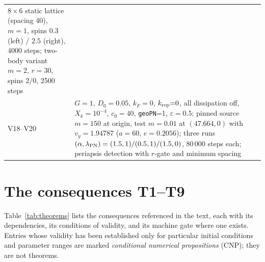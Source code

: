 \documentclass[aps,reprint,amsmath,amssymb,nofootinbib,superscriptaddress,floatfix]{revtex4-2}
\newcommand{\Kt}{X_k}
\newcommand{\Dz}{D_0}
\begin{document}
\begin{table}[h]
\begin{ruledtabular}
\begin{tabular}{p{}p{}}
$8\times6$ static lattice (spacing 40), $m{=}1$, spins $0.3$
(left) / $2.5$ (right), 4000 steps; two-body variant $m{=}2$,
$r{=}30$, spins $2/0$, 2500 steps \\
V18--V20 & $G{=}1$, $\Dz{=}0.05$, $k_F{=}0$, $k_{\rm rep}{=}0$, all
dissipation off, $\Kt{=}10^{-4}$, $c_0{=}40$, \texttt{geoPN}{=}1,
$\varepsilon{=}0.5$; pinned source $m{=}150$ at origin, test
$m{=}0.01$ at $(47.664,0)$ with $v_y{=}1.94787$ ($a{=}60$,
$e{=}0.2056$); three runs $(\alpha,\lambda_{\rm PN}) =
(1.5,1)/(0.5,1)/(1.5,0)$, 80\,000 steps each; periapsis detection
with $r$-gate and minimum spacing \\
\end{tabular}
\end{ruledtabular}
\end{table}

\section{The consequences T1--T9}
\label{app:theorems}

Table~\ref{tab:theorems} lists the consequences referenced in the
text, each with its dependencies, its conditions of validity, and its
machine gate where one exists.
Entries whose validity has been established only for particular
initial conditions and parameter ranges are marked
\emph{conditional numerical propositions} (CNP); they are not
theorems.
\end{document}
